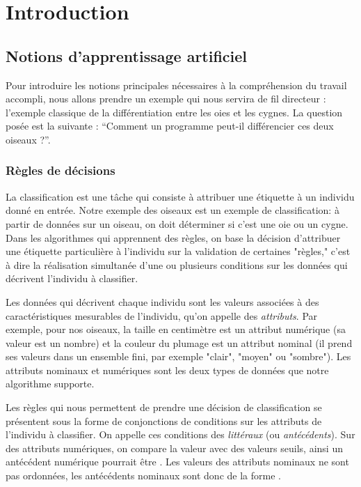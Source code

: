 \section{Introduction}

    \subsection{Notions d'apprentissage artificiel}

        Pour introduire les notions principales nécessaires à la compréhension du travail accompli, nous allons prendre un exemple qui nous servira de fil directeur : l’exemple classique de la différentiation entre les oies et les cygnes. La question posée est la suivante : “Comment un programme peut-il différencier ces deux oiseaux ?”.

        \subsubsection{Règles de décisions}

            La classification est une tâche qui consiste à attribuer une étiquette à un individu donné en entrée. Notre exemple des oiseaux est un exemple de classification: à partir de données sur un oiseau, on doit déterminer si c'est une oie ou un cygne. Dans les algorithmes qui apprennent des règles, on base la décision d'attribuer une étiquette particulière à l'individu sur la validation de certaines "règles," c'est à dire la réalisation simultanée d'une ou plusieurs conditions sur les données qui décrivent l'individu à classifier.

            Les données qui décrivent chaque individu sont les valeurs associées à des caractéristiques mesurables de l'individu, qu'on appelle des \emph{attributs}. Par exemple, pour nos oiseaux, la taille en centimètre est un attribut numérique (sa valeur est un nombre) et la couleur du plumage est un attribut nominal (il prend ses valeurs dans un ensemble fini, par exemple "clair", "moyen" ou "sombre"). Les attributs nominaux et numériques sont les deux types de données que notre algorithme supporte.

            Les règles qui nous permettent de prendre une décision de classification se présentent sous la forme de conjonctions de conditions sur les attributs de l'individu à classifier. On appelle ces conditions des \emph{littéraux} (ou \emph{antécédents}). Sur des attributs numériques, on compare la valeur avec des valeurs seuils, ainsi un antécédent numérique pourrait être . Les valeurs des attributs nominaux ne sont pas ordonnées, les antécédents nominaux sont donc de la forme .

